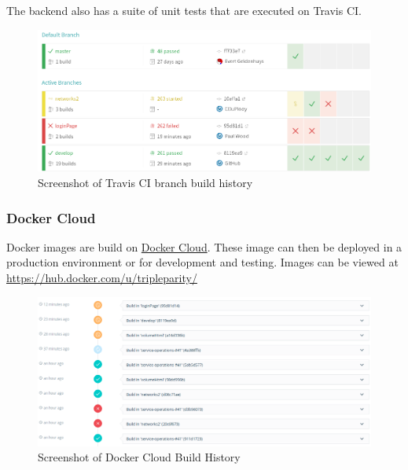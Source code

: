 \documentclass[]{article}
\begin{document}
The backend also has a suite of unit tests that are executed on Travis CI.

\begin{figure}[H]
	\centering
	\includegraphics[scale=0.5]{travis_build_history.png}
	\caption{Screenshot of Travis CI branch build history}
\end{figure}

\subsubsection{Docker Cloud}
Docker images are build on \href{https://cloud.docker.com/}{Docker Cloud}.
These image can then be deployed in a production environment or for development and testing.
Images can be viewed at \url{https://hub.docker.com/u/tripleparity/}

\begin{figure}[H]
	\centering
	\includegraphics[scale=0.5]{docker_cloud_build_history.png}
	\caption{Screenshot of Docker Cloud Build History}
\end{figure}
\end{document}
